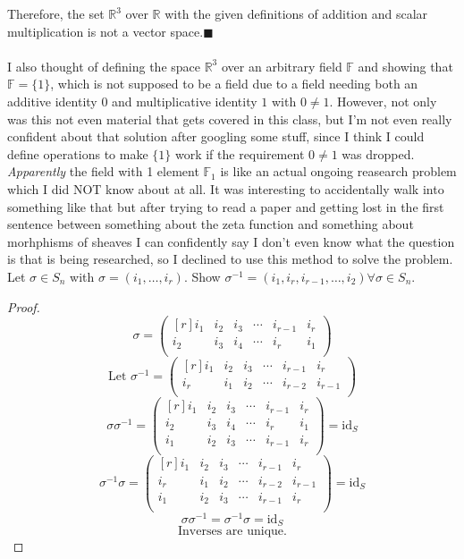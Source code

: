 \documentclass{article}
\begin{document}
Therefore, the set \(\mathbb{R} ^3\) over \(\mathbb{R} \) with the given definitions of addition and scalar multiplication is not a vector space.\hfill\(\blacksquare\)\\
\noindent\makebox[\linewidth]{\rule{\linewidth}{0.4pt}}\\
I also thought of defining the space \(\mathbb{R} ^3\) over an arbitrary field \(\mathbb{F} \) and showing that \(\mathbb{F} =\{ 1 \} \), which is not supposed to be a field due to a field needing both an additive identity \(0\) and multiplicative identity \(1\) with \(0\neq 1\). However, not only was this not even material that gets covered in this class, but I'm not even really confident about that solution after googling some stuff, since I think I could define operations to make \(\{ 1 \} \) work if the requirement \(0\neq 1\) was dropped. \emph{Apparently} the field with 1 element \(\mathbb{F} _1\) is like an actual ongoing reasearch problem which I did NOT know about at all. It was interesting to accidentally walk into something like that but after trying to read a paper and getting lost in the first sentence between something about the zeta function and something about morhphisms of sheaves I can confidently say I don't even know what the question is that is being researched, so I declined to use this method to solve the problem.
\newpage
Let \(\sigma \in S_n\) with \(\sigma =\left( i_1,\ldots,i_r \right) \). Show \(\sigma ^{-1} =\left( i_1,i_r,i_{r-1},\ldots,i_2  \right) \forall \sigma \in S_n\).\\
\begin{proof}
  \[
    \sigma =\begin{pmatrix}[r]
      i_1 & i_2 &i_3&\cdots  & i_{r-1}  &i_r   \\
       i_2&i_3  &i_4&\cdots  &i_r  &i_1   \\
    \end{pmatrix}
  \]
\[
  \text{Let }\sigma ^{-1}  =\begin{pmatrix}[r]
    i_1 &i_2  & i_3&\cdots &i_{r-1}   &i_r   \\
     i_r&i_1   & i_2&\cdots &i_{r-2}   & i_{r-1}   \\
  \end{pmatrix} 
\]
\[
  \sigma \sigma ^{-1} =\begin{pmatrix}[r]
    i_1 & i_2 &i_3&\cdots  & i_{r-1}  &i_r   \\
    i_2&i_3  &i_4&\cdots  &i_r  &i_1   \\
     i_1&i_2  &i_3  &\cdots  &i_{r-1}   &i_r   \\
  \end{pmatrix}=\text{id}_S
\]
\[
  \sigma ^{-1} \sigma = \begin{pmatrix}[r]
    i_1 &i_2  & i_3&\cdots &i_{r-1}   &i_r   \\
     i_r&i_1   & i_2&\cdots &i_{r-2}   & i_{r-1}   \\
     i_1&i_2  &i_3  &\cdots  &i_{r-1}   &i_r   \\
  \end{pmatrix}=\text{id}_S
\]
\[
  \sigma \sigma ^{-1} =\sigma ^{-1} \sigma =\text{id}_S 
\]
\[
  \text{Inverses are unique.} 
\]
\end{proof}
\end{document}
